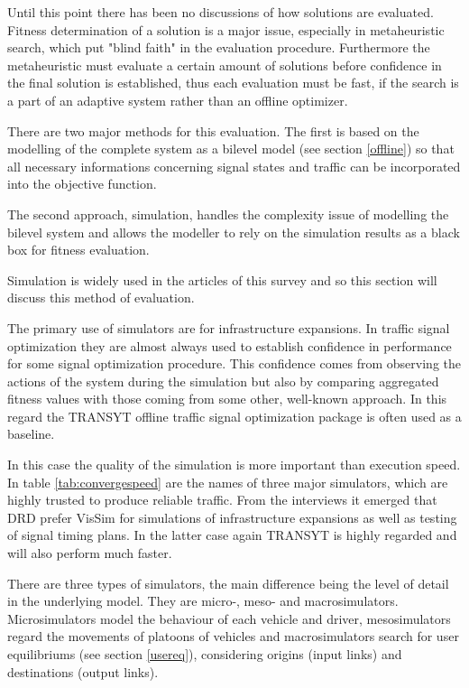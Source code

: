 \label{evaluation}
Until this point there has been no discussions of how solutions are evaluated. Fitness determination of a solution is a major issue, especially in metaheuristic search, which put "blind faith" in the evaluation procedure. Furthermore the metaheuristic must evaluate a certain amount of solutions before confidence in the final solution is established, thus each evaluation must be fast, if the search is a part of an adaptive system rather than an offline optimizer.

There are two major methods for this evaluation. The first is based on the modelling of the complete system as a bilevel model (see section \ref{offline}) so that all necessary informations concerning signal states and traffic can be incorporated into the objective function. 

The second approach, simulation, handles the complexity issue of modelling the bilevel system and allows the modeller to rely on the simulation results as a black box for fitness evaluation. 

Simulation is widely used in the articles of this survey and so this section will discuss this method of evaluation.

The primary use of simulators are for infrastructure expansions. In traffic signal optimization they are almost always used to establish confidence in performance for some signal optimization procedure. This confidence comes from observing the actions of the system during the simulation but also by comparing aggregated fitness values with those coming from some other, well-known approach. In this regard the TRANSYT offline traffic signal optimization package is often used as a baseline. 

In this case the quality of the simulation is more important than execution speed. 
In table \ref{tab:convergespeed} are the names of three major simulators, which are highly trusted to produce reliable traffic. 
From the interviews it emerged that DRD prefer VisSim for simulations of infrastructure expansions as well as testing of signal timing plans. In the latter case again TRANSYT is highly regarded and will also perform much faster.

There are three types of simulators, the main difference being the level of detail in the underlying model. They are micro-, meso- and macrosimulators. Microsimulators model the behaviour of each vehicle and driver, mesosimulators regard the movements of platoons of vehicles and macrosimulators search for user equilibriums (see section \ref{usereq}), considering origins (input links) and destinations (output links).

